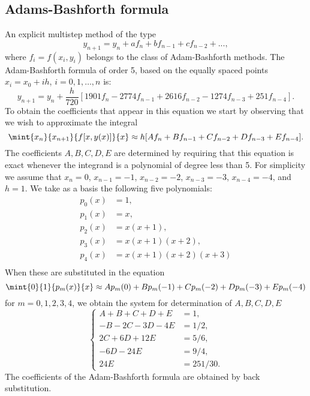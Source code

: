 \subsection{Adams-Bashforth formula}

An explicit multistep method of the type
%
\begin{equation}
  y_{n+1} = y_n + a f_n + b f_{n-1} + c f_{n-2} +...,\label{adams}
\end{equation}
%
where $f_i=f(x_i,y_i)$ belongs to the class of Adam-Bashforth methods.
The Adam-Bashforth formula of order 5, based on the equally spaced
points $x_i = x_0 + i h$, $i=0,1,\ldots,n$ is:
%
\begin{equation}
  y_{n+1} = y_n + \frac{h}{720} [ 1901 f_n - 2774 f_{n-1} +
  2616 f_{n-2} - 1274 f_{n-3} + 251 f_{n-4}].\label{pred}
\end{equation}
%
To obtain the coefficients that appear in this equation we start by
observing that we wish to approximate the integral
%
\begin{equation}
  \mint{x_n}{x_{n+1}}{f[x,y(x)]}{x} \approx h [A f_n + B f_{n-1} +
  C f_{n-2} + D f_{n-3} + E f_{n-4}].
  \label{IVP.eq:26}
\end{equation}
The coefficients $A,B,C,D,E$ are determined by requiring that this
equation is exact whenever the integrand is a polynomial of degree
less than 5. For simplicity we assume that $x_n=0$, $x_{n-1}=-1$,
$x_{n-2}=-2$, $x_{n-3}=-3$, $x_{n-4}=-4$, and $h=1$. We take as a
basis the following five polynomials:
%
\begin{equation}
  \begin{aligned}
    p_0(x)&=1, \\
    p_1(x)&=x, \\
    p_2(x)&=x(x+1), \\
    p_3(x)&=x(x+1)(x+2), \\
    p_4(x)&=x(x+1)(x+2)(x+3) \\
  \end{aligned}
  \label{IVP.eq:27}
\end{equation}
%
When these are substituted in the equation
%
\begin{equation}
  \mint{0}{1}{p_m(x)}{x} \approx A p_m(0)+B p_m(-1)+C p_m(-2)+D p_m(-3)+E p_m(-4)
  \label{IVP.eq:28}
\end{equation}
%
for $m=0,1,2,3,4$, we obtain the system for determination of
$A,B,C,D,E$
%
\begin{equation}
  \left\{
    \begin{aligned}
      A + B + C + D + E & = 1,\\
      -B - 2C - 3D - 4E & = 1/2,\\
      2C + 6D + 12E     & = 5/6,\\
      -6D - 24E         & = 9/4,\\
      24E                & = 251/30.
    \end{aligned} \right .
  \label{IVP.eq:29}
\end{equation}
%
The coefficients of the Adam-Bashforth formula are obtained by back
substitution.

